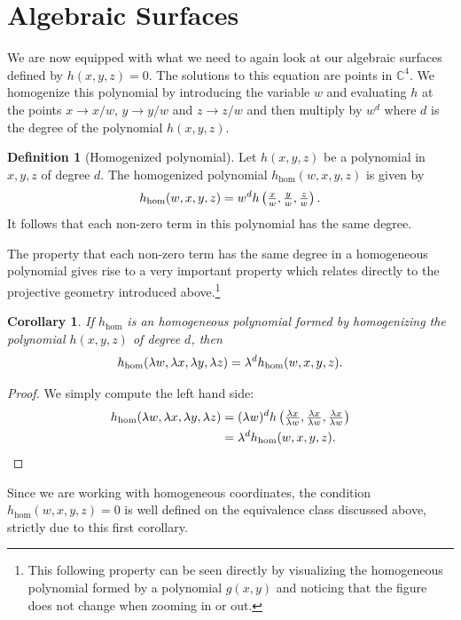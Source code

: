 \documentclass[a4paper]{article}
\theoremstyle{definition}
\newtheorem{defn}{Definition}
\theoremstyle{plain}
\newtheorem{crl}{Corollary}
\newcommand{\C}{\ensuremath{\mathbb{C}}}
\renewcommand{\hom}{\ensuremath{h_{\mathrm{hom}}}}
\begin{document}
    \section{Algebraic Surfaces}
    \label{sec:algebraic_surfaces}
    
    We are now equipped with what we need to again look at our algebraic
    surfaces defined by $h(x, y, z) = 0$. The solutions to this equation are
    points in $\C^4$. We homogenize this polynomial by introducing the variable
    $w$ and evaluating $h$ at the points $x \to x/w$, $y \to y/w$ and $z \to
    z/w$ and then multiply by $w^d$ where $d$ is the degree of the polynomial
    $h(x, y, z)$. 

    \begin{defn}[Homogenized polynomial]
        Let $h(x, y, z)$ be a polynomial in $x, y, z$ of degree $d$. 
        The homogenized polynomial $\hom(w, x, y, z)$ is given by
        \begin{equation}
            \notag
            \hom(w, x, y, z) = w^d h \left( \tfrac{x}{w}, \tfrac{y}{w}, \tfrac{z}{w} \right).
        \end{equation}
        It follows that each non-zero term in this polynomial has the same
        degree.
    \end{defn}
    The property that each non-zero term has the same degree in a homogeneous
    polynomial gives rise to a very important property which relates directly
    to the projective geometry introduced above.\footnote{This following
    property can be seen directly by visualizing the homogeneous polynomial
    formed by a polynomial $g(x, y)$ and noticing that the figure does not
    change when zooming in or out.}
    
    \begin{crl}
        If $\hom$ is an homogeneous polynomial formed by homogenizing the
        polynomial $h(x, y, z)$ of degree $d$, then
        \begin{equation}
            \notag
            \hom(\lambda w, \lambda x, \lambda y, \lambda z) = \lambda^d \hom(w, x, y, z).
        \end{equation}
    \end{crl}
    \begin{proof}
        We simply compute the left hand side:
        \begin{align*}
            \notag
            \hom(\lambda w, \lambda x, \lambda y, \lambda z) &= (\lambda w)^d h
            \left( \tfrac{\lambda x}{\lambda w}, \tfrac{\lambda x}{\lambda w},
            \tfrac{\lambda x}{\lambda w}\right) \\ &= \lambda^d \hom(w, x, y,
            z).
        \end{align*}
    \end{proof}
    Since we are working with homogeneous coordinates, the condition $\hom(w, x,
    y, z) = 0$ is well defined on the equivalence class discussed above,
    strictly due to this first corollary.
   
\end{document}
